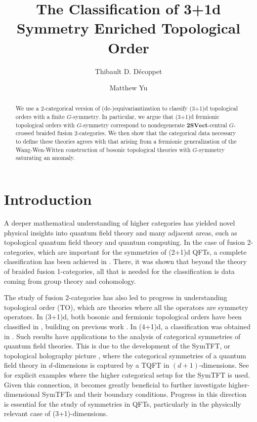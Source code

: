 \documentclass[11pt,reqno]{amsart}
\title{The Classification of 3+1d Symmetry Enriched Topological Order}\author{Thibault D. Décoppet}
\author{Matthew Yu}
\numberwithin{equation}{section}
\theoremstyle{plain}
\theoremstyle{definition}
\begin{document}
\begin{abstract}
We use a 2-categorical version of (de-)equivariantization to classify (3+1)d topological orders with a finite $G$-symmetry. In particular, we argue that (3+1)d fermionic topological orders with $G$-symmetry correspond to nondegenerate $\mathbf{2SVect}$-central $G$-crossed braided fusion 2-categories.
We then show that the categorical data necessary to define these theories agrees with that arising from a fermionic generalization of the Wang-Wen-Witten construction of bosonic topological theories with $G$-symmetry saturating an anomaly.
\end{abstract}

\maketitle


\section{Introduction}

A deeper mathematical understanding of higher categories has yielded novel physical insights into quantum field theory and  many adjacent areas, such as topological quantum field theory and quantum computing. In the case of fusion 2-categories, which are important for the symmetries of (2+1)d QFTs, a complete classification has been achieved in \cite{Decoppet:2024htz}. There, it was shown that beyond the theory of braided fusion 1-categories, all that is needed for the classification is data coming from group theory and cohomology. 

The study of fusion 2-categories has also led to progress in understanding topological order (TO), which are theories where all the operators are symmetry operators. 
In (3+1)d, both bosonic and fermionic topological orders have been classified in \cite{JF}, building on previous work \cite{Lan_2018,Lan_2019}. 
In (4+1)d, a classification was obtained in \cite{JFY}. Such results have applications to the analysis of categorical symmetries of quantum field theories. This is due to the development of the SymTFT, or topological holography picture \cite{Freed:2022qnc,kong2020algebraic,Wen:2013oza}, where the categorical symmetries
of a quantum field theory in $d$-dimensions is captured by a TQFT in $(d+1)$-dimensions. See \cite{Kaidi:2022cpf,Bhardwaj:2023wzd,Bhardwaj:2023ayw,Bhardwaj:2023bbf,Bartsch:2023wvv,Bhardwaj:2024xcx} for explicit examples where the higher categorical setup for the SymTFT is used.  Given this connection, it becomes greatly beneficial to further investigate higher-dimensional SymTFTs and their boundary conditions. Progress in this direction is essential for the study of symmetries in QFTs, particularly in the physically relevant case of (3+1)-dimensions.
\end{document}
